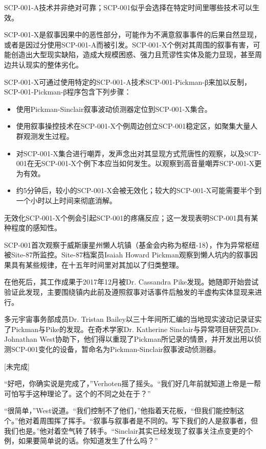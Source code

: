 SCP-001-A技术并非绝对可靠；SCP-001似乎会选择在特定时间里哪些技术可以生效。

SCP-001-X是叙事因果中的恶性部分，可能作为不满意叙事事件的后果自然显现，或者是因过分使用SCP-001-A而被引发。SCP-001-X个例对其周围的叙事有害，可能创造出大型现实缺陷，造成大规模困惑、强力且荒谬性实体及能力显现，甚至周边共认现实的整体劣化。

SCP-001-X可通过使用特定的SCP-001-A技术SCP-001-Pickman-β来加以反制，SCP-001-Pickman-β程序包含下列步骤：

\begin{itemize}
\item {}使用Pickman-Sinclair叙事波动侦测器定位到SCP-001-X集合。
\item {}使用叙事操控技术在SCP-001-X个例周边创立SCP-001稳定区，如聚集大量人群观测发生过程。
\item {}对SCP-001-X集合进行嘲弄，发声念出对其显现方式荒唐性的观察，以及SCP-001在无SCP-001-X个例下本应当如何发生。以观察到高音量嘲弄SCP-001-X更为有效。
\item {}约5分钟后，较小的SCP-001-X会被无效化；较大的SCP-001-X可能需要半个到一个小时以上时间来彻底消解。
\end{itemize}

无效化SCP-001-X个例会引起SCP-001的疼痛反应；这一发现表明SCP-001具有某种程度的感知性。

SCP-001首次观察于威斯康星州懒人坑镇（基金会内称为枢纽-18），作为异常枢纽被Site-87所监控。Site-87档案员Isaiah Howard Pickman观察到懒人坑内的叙事因果具有某些规律，在十五年时间里对其加以了归类整理。

在他死后，其工作成果于2017年12月被Dr. Cassandra Pike发现。她随即开始尝试验证此发现，主要围绕镇内此前及遵照叙事对话事件后触发的半虚构实体显现来进行。

多元宇宙事务部成员Dr. Tristan Bailey以三十年间所汇编的当地现实波动记录证实了Pickman与Pike的发现。在奇术学家Dr. Katherine Sinclair与异常项目研究员Dr. Johnathan West协助下，他们得以重现了Pickman所记录的情景，并开发出用以侦测SCP-001变化的设备，暂命名为Pickman-Sinclair叙事波动侦测器。

{[}未完成]

\hr

“好吧，你确实说是完成了，”Verhoten摇了摇头。“我们好几年前就知道上帝是一帮可怕写手这种理论了。这个的不同之处在于？”

“很简单，”West说道。“我们控制不了他们，”他指着天花板，“但我们能控制这个。”他对着周围挥了挥手。“叙事与叙事者是不同的。写下我们的人是叙事者，但我们也是。”他对着空气转了转手。“Sinclair其实已经发现了叙事关注点变更的个例，如果要简单说的话。你知道发生了什么吗？”

